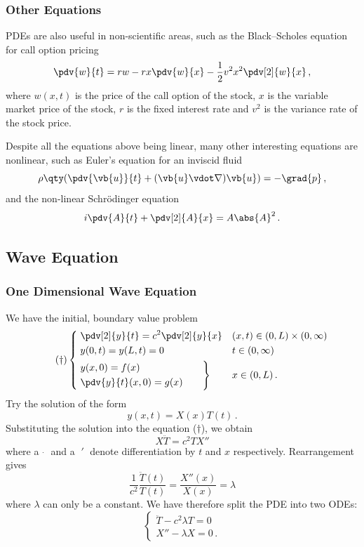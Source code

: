 \documentclass{article}
\theoremstyle{plain}\theoremheaderfont{\normalfont\itshape}\theorembodyfont{\rmfamily}\theoremseparator{.}\newtheorem*{rem}{Remark}\newtheorem*{ex}{Example}\newtheorem*{proof}{Proof}\newtheorem*{altp}{Alternative proof}
\theoremstyle{plain}\theoremheaderfont{\normalfont\bfseries}\theorembodyfont{\rmfamily}\theoremseparator{.}\newtheorem{thm}{Theorem}[section]\newtheorem{lem}[thm]{Lemma}\newtheorem{prop}[thm]{Proposition}\newtheorem*{cor}{Corollary}\newtheorem{defn}[thm]{Definition}\newtheorem{clm}[thm]{Claim}\newtheorem{clminproof}{Claim}
\theoremstyle{break}\theoremheaderfont{\normalfont\itshape}\theorembodyfont{\rmfamily}\theoremseparator{.\medskip}\newtheorem*{proofskip}{Proof}\newtheorem*{exs}{Examples}\newtheorem*{rems}{Remarks}
\theoremstyle{break}\theoremheaderfont{\normalfont\bfseries}\theorembodyfont{\rmfamily}\theoremseparator{.\medskip}\newtheorem{lemskip}[thm]{Lemma}\newtheorem{defnskip}[thm]{Definition}\newtheorem{propskip}[thm]{Proposition}\newtheorem{thmskip}[thm]{Theorem}
\numberwithin{equation}{section}
\begin{document}
	\subsubsection{Other Equations}
	PDEs are also useful in non-scientific areas, such as the Black--Scholes equation for call option pricing
	\[\pdv{w}{t}=rw-rx\pdv{w}{x}-\frac{1}{2}v^2x^2\pdv[2]{w}{x}\,,\]
	where \(w(x,t)\) is the price of the call option of the stock, \(x\) is the variable market price of the stock, \(r\) is the fixed interest rate and \(v^2\) is the variance rate of the stock price.
	
	Despite all the equations above being linear, many other interesting equations are nonlinear, such as Euler's equation for an inviscid fluid
	\[\rho\qty(\pdv{\vb{u}}{t}+(\vb{u}\vdot\nabla)\vb{u})=-\grad{p}\,,\]
	and the non-linear Schr\"{o}dinger equation
	\[i\pdv{A}{t}+\pdv[2]{A}{x}=A\abs{A}^2\,.\]
	
	\subsection{Wave Equation}
	\subsubsection{One Dimensional Wave Equation}
	We have the initial, boundary value problem
	\begin{equation}\tag{\(\dagger\)}
			\left\{\begin{aligned}
			& \;\pdv[2]{y}{t}=c^2\pdv[2]{y}{x} && (x,t)\in(0,L)\times(0,\infty)\\
			& \;y(0,t)=y(L,t)=0 && t\in(0,\infty)\\
			& \left.\begin{aligned}
				& y(x,0)=f(x)\\
				& \pdv{y}{t}\,\!(x,0)=g(x)
			\end{aligned}\qquad\right\} && x\in(0,L)\,.
		\end{aligned}\right.
	\end{equation}
	Try the solution of the form
	\[y(x,t)=X(x)T(t)\,.\]	
	Substituting the solution into the equation (\(\dagger\)), we obtain
	\[X\ddot{T}=c^2TX''\]
	where a \(\;\dot{ }\;\) and a \(\;'\;\) denote differentiation by \(t\) and \(x\) respectively. Rearrangement gives
	\[\frac{1}{c^2}\frac{\ddot{T}(t)}{T(t)}=\frac{X''(x)}{X(x)}=\lambda\]
	where \(\lambda\) can only be a constant. We have therefore split the PDE into two ODEs:
	\[\begin{cases}
		\ddot{T}-c^2\lambda T=0\\
		X''-\lambda X=0\,.
	\end{cases}\]
	
\end{document}
